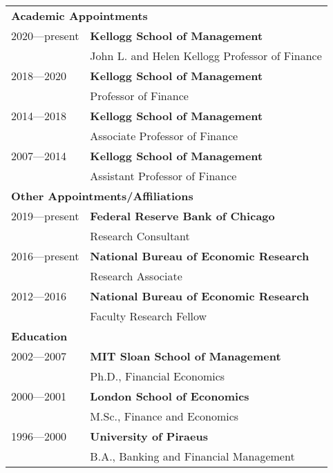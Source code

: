 \documentclass[11pt,letterpaper,serif,overlapped]{res}
\begin{document}
\begin{resume}
\begin{tabular}{ll}\\[1cm]
\multicolumn{2}{l}{\textbf{Academic Appointments}}\\
[0.25cm]
2020---present & \textbf{Kellogg School of Management}\\
& John L. and Helen Kellogg Professor of Finance\\
2018---2020 & \textbf{Kellogg School of Management}\\
& Professor of Finance\\
2014---2018 & \textbf{Kellogg School of Management}\\
& Associate Professor of Finance\\
 2007---2014 & \textbf{Kellogg School of Management}\\
& Assistant Professor of Finance\\
[0.5cm]
\multicolumn{2}{l}{\textbf{Other Appointments/Affiliations}}\\
[0.25cm]
2019---present & \textbf{Federal Reserve Bank of Chicago}\\
& Research Consultant \\[0.1cm]
2016---present & \textbf{National Bureau of Economic Research  }\\
& Research Associate\\[0.1cm]
2012---2016 & \textbf{National Bureau of Economic Research}\\
& Faculty Research Fellow\\
[0.5cm]
\multicolumn{2}{l}{\textbf{Education}}\\
[0.25cm]
2002---2007 & \textbf{MIT Sloan School of Management}\\
& Ph.D., Financial Economics\\[0.1cm]
2000---2001 & \textbf{London School of Economics}\\
& M.Sc., Finance and Economics \\[0.1cm]
1996---2000 & \textbf{University of Piraeus} \\
& B.A., Banking and Financial Management\\
\end{tabular}
 
\vspace{0.5cm}
\begin{itemize}
 




 


\end{itemize}
\end{resume}
\end{document}
